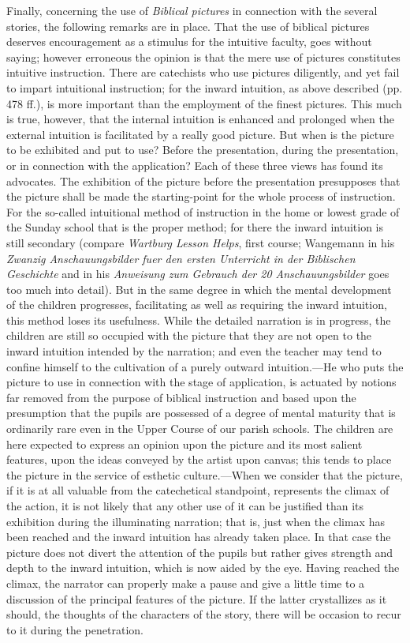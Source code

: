 Finally, concerning the use of \emph{Biblical pictures} in connection with the several stories, the following remarks are in place. That the use of biblical pictures deserves encouragement as a stimulus for the intuitive faculty, goes without saying; however erroneous the opinion is that the mere use of pictures constitutes intuitive instruction. There are catechists who use pictures diligently, and yet fail to impart intuitional instruction; for the inward intuition, as above described (pp. 478 ff.), is more important than the employment of the finest pictures. This much is true, however, that the internal intuition is enhanced and prolonged when the external intuition is facilitated by a really good picture. But when is the picture to be exhibited and put to use? Before the presentation, during the presentation, or in connection with the application? Each of these three views has found its advocates. The exhibition of the picture before the presentation presupposes that the picture shall be made the starting-point for the whole process of instruction. For the so-called intuitional method of instruction in
the home or lowest grade of the Sunday school that is the proper method; for there the inward intuition is still secondary (compare \emph{Wartburg Lesson Helps}, first course; Wangemann in his \emph{Zwanzig Anschauungsbilder fuer den ersten Unterricht in der Biblischen Geschichte} and in his \emph{Anweisung zum Gebrauch der 20 Anschauungsbilder} goes too much into detail). But in the same degree in which the mental development of the children progresses, facilitating as well as requiring the inward intuition, this method loses its usefulness. While the detailed narration is in progress, the children are still so occupied with the picture that they are not open to the inward intuition intended by the narration; and even the teacher may tend to confine himself to the cultivation of a purely outward intuition.—He who puts the picture to use in connection with the stage of application, is actuated by notions far removed from the purpose of biblical instruction and based upon the presumption that the pupils are possessed of a degree of mental maturity that is ordinarily rare even in the Upper Course of our parish schools. The children are here expected to express an opinion upon the picture and its most salient features, upon the ideas conveyed by the artist upon canvas; this tends to place the picture in the service of esthetic culture.—When we consider that the picture, if it is at all valuable from the catechetical standpoint, represents the climax of the action, it is not likely that any other use of it can be justified than its exhibition during the illuminating narration; that is, just when the climax has been reached and the inward intuition has already taken place. In that case the picture does not divert the attention of the pupils but rather gives strength and depth to the inward intuition, which is now aided by the eye. Having reached the climax, the narrator can properly make a pause and give a little time to a discussion of the principal features of the picture. If the latter crystallizes as it should, the thoughts of the
characters of the story, there will be occasion to recur to it during the penetration.

